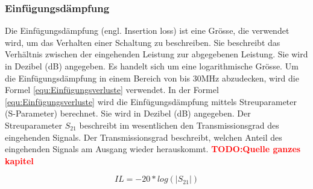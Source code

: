 \subsubsection{Einfügungsdämpfung}\label{subsec:einfuge}

Die Einfügungsdämpfung (engl. Insertion loss) ist eine Grösse, die verwendet wird, um das Verhalten einer Schaltung zu beschreiben. Sie beschreibt das Verhältnis zwischen der eingehenden Leistung zur abgegebenen Leistung. Sie wird in Dezibel (dB) angegeben. Es handelt sich um eine logarithmische Grösse. Um die Einfügungsdämpfung in einem Bereich von bis 30MHz abzudecken, wird die Formel \ref{equ:Einfügungsverluste} verwendet. In der Formel \ref{equ:Einfügungsverluste} wird die Einfügungsdämpfung mittels Streuparameter (S-Parameter) berechnet. Sie wird in Dezibel (dB) angegeben. Der Streuparameter $S_{21}$ beschreibt im wesentlichen den Transmissionsgrad des eingehenden Signals. Der Transmissionsgrad beschreibt, welchen Anteil des eingehenden Signals am Ausgang wieder herauskommt. \textcolor{red}{\textbf{TODO:Quelle ganzes kapitel}}



\begin{equation}\label{equ:Einfügungsverluste}
	IL = -20*log (\left\lvert S_{21} \right\rvert)
\end{equation}

\newpage


